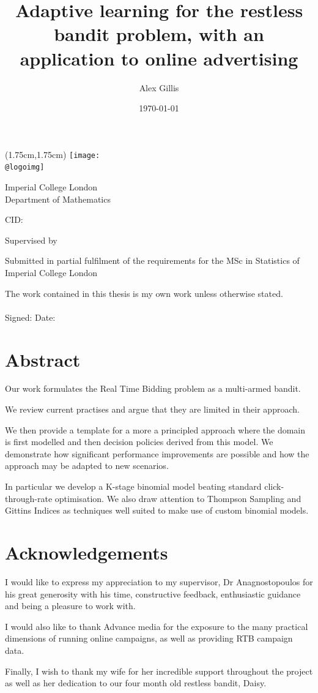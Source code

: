 \documentclass[11pt,a4,singlespacing,titlepagenumber=on]{scrreprt}
\title{Adaptive learning for the restless bandit problem, with an application to online advertising}
\author{Alex Gillis}
\date{\today}
\makeatletter
\numberwithin{equation}{chapter} %
\theoremstyle{remark}
\renewcommand{\maketitle}{
\begin{titlepage}
\ifdefined\@logoimg
\begin{textblock*}{8cm}(1.75cm,1.75cm)
\texttt{[image: \\@logoimg]}
\end{textblock*}
\vspace*{1cm}
\else
\fi
\begin{center}
\vspace*{\stretch{0.1}}
Imperial College London\\
Department of Mathematics\par
\vspace*{\stretch{1}} %
{\titlefont\Huge \@title\par} %
\vspace*{\stretch{2}}
{\Large \@author \par}
\vspace*{1em}
{\large CID: \@CID \par}
\vspace*{\stretch{0.5}}
{\large Supervised by \@supervisor \par}
\vspace*{\stretch{3}}
{\Large \@date \par}
\vspace*{\stretch{1}}
{\large Submitted in partial fulfilment of the requirements for the
MSc in Statistics of Imperial College London}
\vspace*{\stretch{0.1}}
\end{center}%
\end{titlepage}%
}
\newcommand*{\declaration}{%
\vspace*{0.3\textheight}
The work contained in this thesis is my own work unless
otherwise stated.\\
\vspace*{0.1\textheight}\\
\hspace*{0.25\textwidth}Signed: \hspace{0.25\textwidth} Date:
\clearpage}
\renewenvironment{abstract}%
{\chapter*{Abstract}\thispagestyle{plain}}%
{\clearpage}
\makeatother
\begin{document}
\maketitle %

\declaration %

\begin{abstract}

Our work formulates the Real Time Bidding problem as a multi-armed bandit.

We review current practises and argue that they are limited in their approach. 

We then provide a template for a more a principled approach where the domain is first modelled and then decision policies derived from this model. We demonstrate how significant performance improvements are possible and how the approach may be adapted to new scenarios.
 
In particular we develop a K-stage binomial model beating standard click-through-rate optimisation. We also draw attention to Thompson Sampling and Gittins Indices as techniques well suited to make use of custom binomial models.

\end{abstract}

\newpage
\chapter*{Acknowledgements}

I would like to express my appreciation to my supervisor, Dr Anagnostopoulos for his great generosity with his time, constructive feedback, enthusiastic guidance and being a pleasure to work with.

I would also like to thank Advance media for the exposure to the many practical dimensions of running online campaigns, as well as providing RTB campaign data. 

Finally, I wish to thank my wife for her incredible support throughout the project as well as her dedication to our four month old restless bandit, Daisy.

\newpage

\renewcommand{\contentsname}{Table of Contents}
\tableofcontents
\newpage

\listoffigures 
\end{document}
